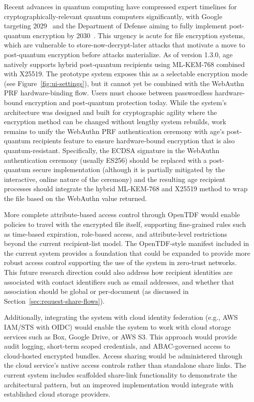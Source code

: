 Recent advances in quantum computing have compressed expert timelines for cryptographically-relevant quantum computers significantly, with Google targeting 2029~\cite{google_pqc_2026} and the Department of Defense aiming to fully implement post-quantum encryption by 2030~\cite{dod_pqc_2026}. This urgency is acute for file encryption systems, which are vulnerable to store-now-decrypt-later attacks that motivate a move to post-quantum encryption before attacks materialize. As of version 1.3.0, age natively supports hybrid post-quantum recipients using ML-KEM-768 combined with X25519. The prototype system exposes this as a selectable encryption mode (see Figure~\ref{fig:ui-settings}), but it cannot yet be combined with the WebAuthn PRF hardware-binding flow. Users must choose between passwordless hardware-bound encryption and post-quantum protection today. While the system's architecture was designed and built for cryptographic agility where the encryption method can be changed without lengthy system rebuilds, work remains to unify the WebAuthn PRF authentication ceremony with age's post-quantum recipients feature to ensure hardware-bound encryption that is also quantum-resistant. Specifically, the ECDSA signature in the WebAuthn authentication ceremony (usually ES256) should be replaced with a post-quantum secure implementation (although it is partially mitigated by the interactive, online nature of the ceremony) and the resulting age recipient processes should integrate the hybrid ML-KEM-768 and X25519 method to wrap the file based on the WebAuthn value returned.

More complete attribute-based access control through OpenTDF would enable policies to travel with the encrypted file itself, supporting fine-grained rules such as time-based expiration, role-based access, and attribute-level restrictions beyond the current recipient-list model. The OpenTDF-style manifest included in the current system provides a foundation that could be expanded to provide more robust access control supporting the use of the system in zero-trust networks. This future research direction could also address how recipient identities are associated with contact identifiers such as email addresses, and whether that association should be global or per-document (as discussed in Section~\ref{sec:request-share-flows}).

Additionally, integrating the system with cloud identity federation (e.g., AWS IAM/STS with OIDC) would enable the system to work with cloud storage services such as Box, Google Drive, or AWS S3. This approach would provide audit logging, short-term scoped credentials, and ABAC-governed access to cloud-hosted encrypted bundles. Access sharing would be administered through the cloud service's native access controls rather than standalone share links. The current system includes scaffolded share-link functionality to demonstrate the architectural pattern, but an improved implementation would integrate with established cloud storage providers.

